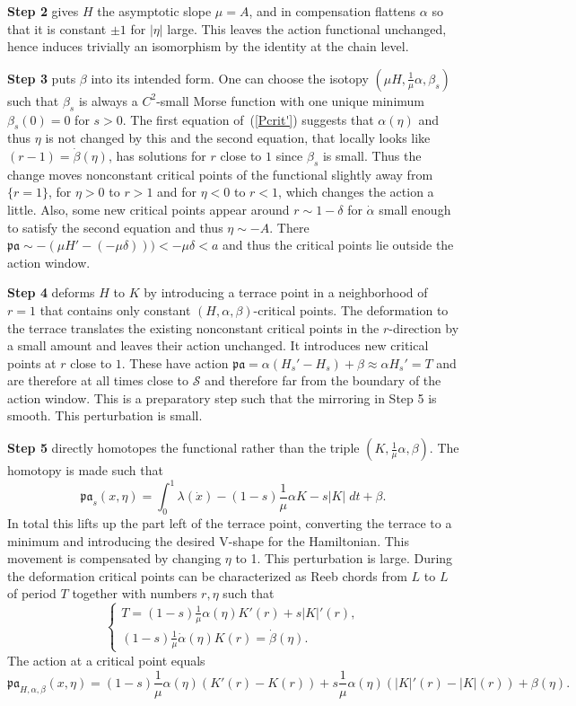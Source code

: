 \documentclass{amsart}
\newcommand{\Scal}{{\mathcal{S}}}
\newcommand{\pacal}{\mathfrak{pa}}
\theoremstyle{definition}
\theoremstyle{remark}
\numberwithin{equation}{section}
\begin{document}
\textbf{Step 2} gives $H$ the asymptotic slope $\mu=A$, and in compensation flattens $\alpha$ so that it is constant $\pm1$ for $|\eta|$ large. This leaves the action functional unchanged, hence induces trivially an isomorphism by the identity at the chain level.

\textbf{Step 3} puts $\beta$ into its intended form. One can choose the isotopy $(\mu H,\frac 1\mu\alpha,\beta_s)$ such that $\beta_s$ is always a $C^2$-small Morse function with one unique minimum $\beta_s(0)=0$ for $s>0$. The first equation of~(\ref{Pcrit'}) suggests that $\alpha(\eta)$ and thus $\eta$ is not changed by this and the second equation, that locally looks like $(r-1)=\dot\beta(\eta)$, has solutions for $r$ close to $1$ since $\beta_s$ is small. Thus the change moves nonconstant critical points of the functional slightly away from $\{r=1\}$, for $\eta>0$ to $r>1$ and for $\eta<0$ to $r<1$, which changes the action a little. Also, some new critical points appear around $r\sim 1-\delta$ for $\dot\alpha$ small enough to satisfy the second equation and thus $\eta\sim -A$. There $\pacal\sim -(\mu H'- (-\mu\delta)))<-\mu\delta<a$ and thus the critical points lie outside the action window. 

\textbf{Step 4} deforms $H$ to $K$ by introducing a terrace point in a neighborhood of $r=1$ that contains only constant $(H,\alpha,\beta)$-critical points. The deformation to the terrace translates the existing nonconstant critical points in the $r$-direction by a small amount and leaves their action unchanged. It introduces new critical points at $r$ close to $1$. These have action $\pacal=\alpha(H_s'-H_s)+\beta\approx \alpha H_s'=T$ and are therefore at all times close to $\Scal$ and therefore far from the boundary of the action window. This is a preparatory step such that the mirroring in Step 5 is smooth. This perturbation is small.

\textbf{Step 5} directly homotopes the functional rather than the triple $(K,\frac 1\mu\alpha,\beta)$. The homotopy is made such that 
$$\pacal_s(x,\eta)=\int_0^1\lambda(\dot x) - (1-s)\frac 1\mu\alpha K- s|K|\;dt +\beta.$$
In total this lifts up the part left of the terrace point, converting the terrace to a minimum and introducing the desired V-shape for the Hamiltonian. This movement is compensated by changing $\eta$ to 1. This perturbation is large. 
During the deformation critical points can be characterized as Reeb chords from $L$ to $L$ of period $T$ together with numbers $r,\eta$ such that 
\begin{equation}
\label{Pcrit''}
	\begin{cases}
		T=(1-s)\frac1\mu\alpha(\eta)K'(r) + s|K|'(r),\\
		(1-s)\frac1\mu\dot\alpha(\eta)K(r)=\dot\beta(\eta).
	\end{cases}
\end{equation}
The action at a critical point equals 
$$\pacal_{H,\alpha,\beta}(x,\eta)=(1-s)\frac1\mu\alpha(\eta)(K'(r) - K(r))+s\frac1\mu\alpha(\eta)(|K|'(r) - |K|(r))+\beta(\eta).$$
\end{document}
